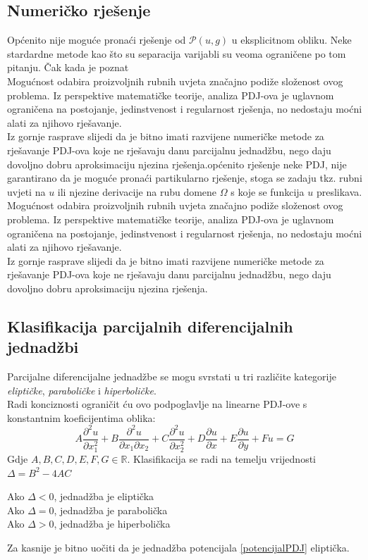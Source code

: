 \documentclass[zavrsnirad]{../fer}
\begin{document}
\subsection{Numeričko rješenje}
Općenito nije moguće pronaći rješenje od $\mathcal{P}(u,g)$ 
u eksplicitnom obliku. Neke stardardne metode kao što 
su separacija varijabli su veoma ograničene po tom pitanju.
Čak kada je poznat
\bigskip
\\ 
Mogućnost odabira proizvoljnih rubnih uvjeta značajno 
podiže složenost ovog problema. Iz perspektive matematičke 
teorije, analiza PDJ-ova je uglavnom ograničena na  
postojanje, jedinstvenost i regularnost rješenja, no 
nedostaju moćni alati za njihovo rješavanje. 
\bigskip
\\ 
Iz gornje rasprave slijedi da je bitno imati 
razvijene numeričke metode za rješavanje PDJ-ova koje 
ne rješavaju danu parcijalnu jednadžbu, nego daju dovoljno 
dobru aproksimaciju njezina rješenja.općenito rješenje neke PDJ, nije garantirano 
da je moguće pronaći partikularno rješenje, stoga 
se zadaju tkz. rubni uvjeti na $u$ ili njezine derivacije na 
rubu domene $\Omega$ s koje se funkcija $u$ preslikava.
\bigskip
\\ 
Mogućnost odabira proizvoljnih rubnih uvjeta značajno 
podiže složenost ovog problema. Iz perspektive matematičke 
teorije, analiza PDJ-ova je uglavnom ograničena na  
postojanje, jedinstvenost i regularnost rješenja, no 
nedostaju moćni alati za njihovo rješavanje. 
\bigskip
\\ 
Iz gornje rasprave slijedi da je bitno imati 
razvijene numeričke metode za rješavanje PDJ-ova koje 
ne rješavaju danu parcijalnu jednadžbu, nego daju dovoljno 
dobru aproksimaciju njezina rješenja.
\newpage 

\subsection{Klasifikacija parcijalnih diferencijalnih jednadžbi}
Parcijalne diferencijalne jednadžbe se mogu svrstati u 
tri različite kategorije \textit{eliptičke},
\textit{paraboličke} i \textit{hiperboličke}.
\\
Radi konciznosti ograničit ću ovo podpoglavlje na linearne PDJ-ove s 
konstantnim koeficijentima oblika:
$$
A\frac{\partial^2 u}{\partial x_1^2}
+ B \frac{\partial^2 u}{\partial x_1 \partial x_2}
+ C \frac{\partial^2 u}{\partial x_2^2}
+ D \frac{\partial u}{\partial x}
+ E \frac{\partial u}{\partial y}
+ F u = G
$$
Gdje $A,B,C,D,E,F,G \in \mathbb{R}$.
Klasifikacija se radi na temelju vrijednosti $\Delta = B^2 - 4AC$
\begin{center}
  Ako $\Delta < 0$, jednadžba je eliptička\\ 
  Ako $\Delta = 0$, jednadžba je parabolička\\ 
  Ako $\Delta > 0$, jednadžba je hiperbolička 
\end{center}
Za kasnije je bitno uočiti da je jednadžba
potencijala \ref{potencijalPDJ}
eliptička. 
\end{document}
